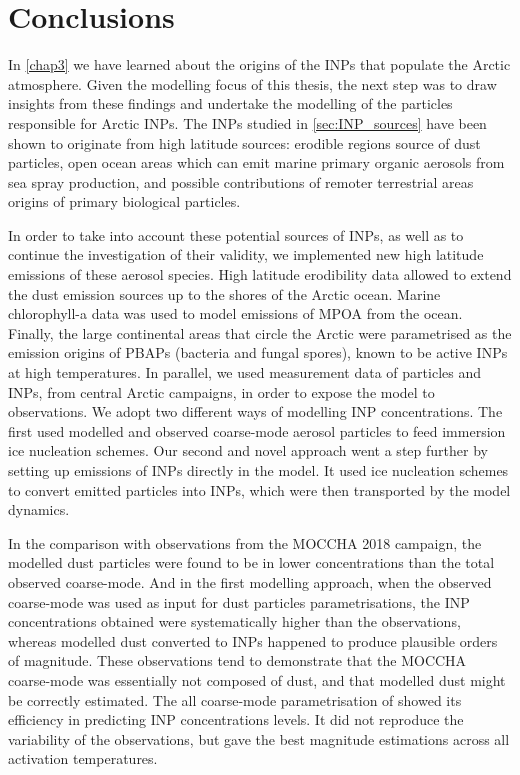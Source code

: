\section{Conclusions}
\label{sec:conclusion_chap4}
    In \cref{chap3} we have learned about the origins of the INPs that populate the Arctic atmosphere. Given the modelling focus of this thesis, the next step was to draw insights from these findings and undertake the modelling of the particles responsible for Arctic INPs.
    The INPs studied in \cref{sec:INP_sources} have been shown to originate from high latitude sources: erodible regions source of dust particles, open ocean areas which can emit marine primary organic aerosols from sea spray production, and possible contributions of remoter terrestrial areas origins of primary biological particles.

    In order to take into account these potential sources of INPs, as well as to continue the investigation of their validity, we implemented new high latitude emissions of these aerosol species.
    High latitude erodibility data allowed to extend the dust emission sources up to the shores of the Arctic ocean.
    Marine chlorophyll-a data was used to model emissions of MPOA from the ocean. 
    Finally, the large continental areas that circle the Arctic were parametrised as the emission origins of PBAPs (bacteria and fungal spores), known to be active INPs at high temperatures.
    In parallel, we used measurement data of particles and INPs, from central Arctic campaigns, in order to expose the model to observations.
    We adopt two different ways of modelling INP concentrations. The first used modelled and observed coarse-mode aerosol particles to feed immersion ice nucleation schemes. 
    Our second and novel approach went a step further by setting up emissions of INPs directly in the model. It used ice nucleation schemes to convert emitted particles into INPs, which were then transported by the model dynamics.

    In the comparison with observations from the MOCCHA 2018 campaign, the modelled dust particles were found to be in lower concentrations than the total observed coarse-mode. And in the first modelling approach, when the observed coarse-mode was used as input for dust particles parametrisations, the INP concentrations obtained were systematically higher than the observations, whereas modelled dust converted to INPs happened to produce plausible orders of magnitude.
    These observations tend to demonstrate that the MOCCHA coarse-mode was essentially not composed of dust, and that modelled dust might be correctly estimated.
    The all coarse-mode parametrisation of \citet{demott_predicting_2010} showed its efficiency in predicting INP concentrations levels. It did not reproduce the variability of the observations, but gave the best magnitude estimations across all activation temperatures.

